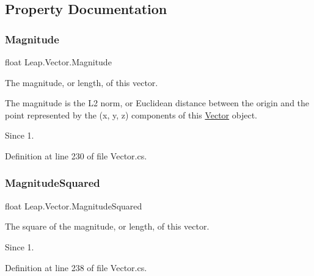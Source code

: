 \subsection{Property Documentation}
\mbox{\label{struct_leap_1_1_vector_afd51a6a7664efda2e5dde7a5e6a5313a}} 
\subsubsection{\texorpdfstring{Magnitude}{Magnitude}}
{\footnotesize\ttfamily float Leap.\+Vector.\+Magnitude\hspace{0.3cm}{\ttfamily [get]}}



The magnitude, or length, of this vector. 

The magnitude is the L2 norm, or Euclidean distance between the origin and the point represented by the (x, y, z) components of this \mbox{\hyperlink{struct_leap_1_1_vector}{Vector}} object. \begin{DoxySince}{Since}
1. 
\end{DoxySince}


Definition at line 230 of file Vector.\+cs.

\mbox{\label{struct_leap_1_1_vector_aec7fdb9c75f451a3c0a28fddfba97143}} 
\subsubsection{\texorpdfstring{MagnitudeSquared}{MagnitudeSquared}}
{\footnotesize\ttfamily float Leap.\+Vector.\+Magnitude\+Squared\hspace{0.3cm}{\ttfamily [get]}}



The square of the magnitude, or length, of this vector. 

\begin{DoxySince}{Since}
1. 
\end{DoxySince}


Definition at line 238 of file Vector.\+cs.

\mbox{\label{struct_leap_1_1_vector_a14c14f9559420ad1f1a9e1b8884859c4}} 
